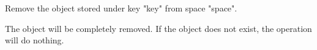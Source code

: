 Remove the object stored under key "key" from space "space".

The object will be completely removed.  If the object does not exist, the
operation will do nothing.




